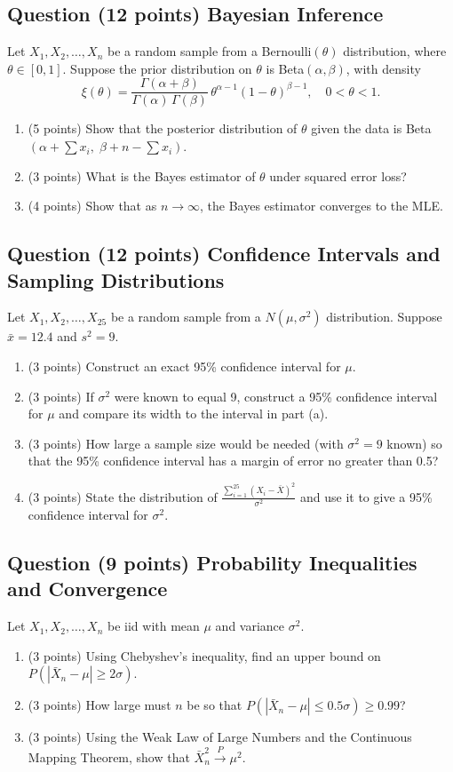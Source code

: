 \documentclass[11pt]{article}
\newcounter{qnum}
\newcommand{\question}[2]{\stepcounter{qnum}\subsection*{Question \theqnum \quad (#1 points) \hfill #2}}
\begin{document}
\vspace{3.5in}

\question{12}{Bayesian Inference}
Let $X_1, X_2, \ldots, X_n$ be a random sample from a Bernoulli$(\theta)$ distribution, where $\theta \in [0,1]$. Suppose the prior distribution on $\theta$ is Beta$(\alpha, \beta)$, with density
$$\xi(\theta) = \frac{\Gamma(\alpha + \beta)}{\Gamma(\alpha)\,\Gamma(\beta)}\,\theta^{\alpha - 1}(1-\theta)^{\beta - 1}, \quad 0 < \theta < 1.$$

\begin{enumerate}[label=(\alph*)]
\item (5 points) Show that the posterior distribution of $\theta$ given the data is Beta$(\alpha + \sum x_i,\; \beta + n - \sum x_i)$.
\item (3 points) What is the Bayes estimator of $\theta$ under squared error loss?
\item (4 points) Show that as $n \to \infty$, the Bayes estimator converges to the MLE.
\end{enumerate}

\newpage

\question{12}{Confidence Intervals and Sampling Distributions}
Let $X_1, X_2, \ldots, X_{25}$ be a random sample from a $N(\mu, \sigma^2)$ distribution. Suppose $\bar x = 12.4$ and $s^2 = 9$.

\begin{enumerate}[label=(\alph*)]
\item (3 points) Construct an exact 95\% confidence interval for $\mu$.
\item (3 points) If $\sigma^2$ were known to equal 9, construct a 95\% confidence interval for $\mu$ and compare its width to the interval in part (a).
\item (3 points) How large a sample size would be needed (with $\sigma^2 = 9$ known) so that the 95\% confidence interval has a margin of error no greater than 0.5?
\item (3 points) State the distribution of $\displaystyle\frac{\sum_{i=1}^{25}(X_i - \bar X)^2}{\sigma^2}$ and use it to give a 95\% confidence interval for $\sigma^2$.
\end{enumerate}

\vspace{4in}

\question{9}{Probability Inequalities and Convergence}
Let $X_1, X_2, \ldots, X_n$ be iid with mean $\mu$ and variance $\sigma^2$.

\begin{enumerate}[label=(\alph*)]
\item (3 points) Using Chebyshev's inequality, find an upper bound on $P(|\bar X_n - \mu| \geq 2\sigma)$.
\item (3 points) How large must $n$ be so that $P(|\bar X_n - \mu| \leq 0.5\sigma) \geq 0.99$?
\item (3 points) Using the Weak Law of Large Numbers and the Continuous Mapping Theorem, show that $\bar X_n^2 \xrightarrow{P} \mu^2$.
\end{enumerate}
\end{document}

